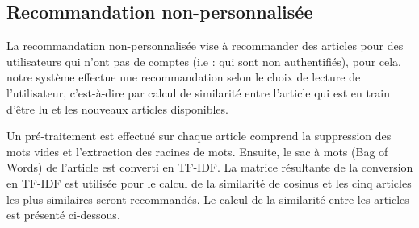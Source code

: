     \subsection{Recommandation non-personnalisée}
    La recommandation non-personnalisée vise à recommander des articles pour des utilisateurs qui n'ont pas de comptes (i.e : qui sont non authentifiés), pour cela, notre système effectue une recommandation selon le choix de lecture de l'utilisateur, c'est-à-dire par calcul de similarité entre l'article qui est en train d'être lu et les nouveaux articles disponibles. 

    Un pré-traitement est effectué sur chaque article comprend la suppression des mots vides et l'extraction des racines de mots. Ensuite, le sac à mots (Bag of Words) de l'article est converti en TF-IDF. La matrice résultante de la conversion en TF-IDF est utilisée pour le calcul de la similarité de cosinus et les cinq articles les plus similaires seront recommandés. Le calcul de la similarité entre les articles est présenté ci-dessous.

